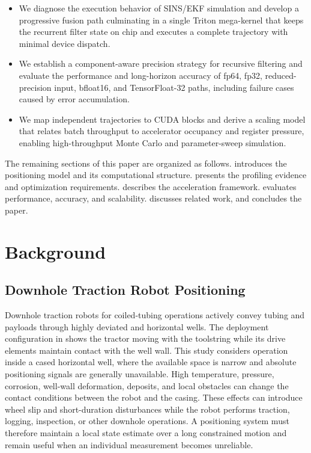 \documentclass[research]{fcs}
\begin{document}
\begin{itemize}
  \item We diagnose the execution behavior of SINS/EKF simulation and develop a progressive fusion path culminating in a single Triton mega-kernel that keeps the recurrent filter state on chip and executes a complete trajectory with minimal device dispatch.
  \item We establish a component-aware precision strategy for recursive filtering and evaluate the performance and long-horizon accuracy of fp64, fp32, reduced-precision input, bfloat16, and TensorFloat-32 paths, including failure cases caused by error accumulation.
  \item We map independent trajectories to CUDA blocks and derive a scaling model that relates batch throughput to accelerator occupancy and register pressure, enabling high-throughput Monte Carlo and parameter-sweep simulation.
\end{itemize}

The remaining sections of this paper are organized as follows.  introduces the positioning model and its computational structure.  presents the profiling evidence and optimization requirements.  describes the acceleration framework.  evaluates performance, accuracy, and scalability.  discusses related work, and  concludes the paper.

\section{Background}
\label{sec:background}

\subsection{Downhole Traction Robot Positioning}
\label{subsec:positioning-background}

Downhole traction robots for coiled-tubing operations actively convey tubing and payloads through highly deviated and horizontal wells. The deployment configuration in  shows the tractor moving with the toolstring while its drive elements maintain contact with the well wall. This study considers operation inside a cased horizontal well, where the available space is narrow and absolute positioning signals are generally unavailable. High temperature, pressure, corrosion, well-wall deformation, deposits, and local obstacles can change the contact conditions between the robot and the casing. These effects can introduce wheel slip and short-duration disturbances while the robot performs traction, logging, inspection, or other downhole operations. A positioning system must therefore maintain a local state estimate over a long constrained motion and remain useful when an individual measurement becomes unreliable.
\end{document}
